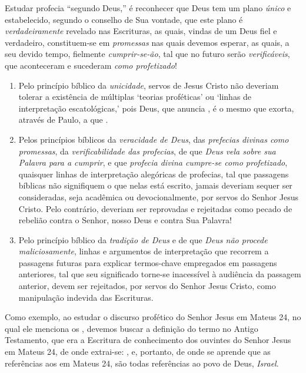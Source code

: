     Estudar profecia ``segundo Deus,'' é reconhecer que Deus tem um plano \emph{único} e estabelecido, segundo o conselho de Sua
    vontade, que este plano é \emph{verdadeiramente} revelado nas Escrituras, as quais, vindas de um  Deus  fiel  e  verdadeiro,
    constituem-se em \emph{promessas} nas quais devemos esperar, as quais, a seu devido tempo,  fielmente  \emph{cumprir-se-ão},
    tal que no futuro serão \emph{verificáveis}, que aconteceram e sucederam \emph{como profetizado}!

    \begin{enumerate}

        \item Pelo princípio bíblico da \emph{unicidade}, servos de Jesus Cristo não deveriam tolerar  a  existência
            de múltiplas `teorias proféticas' ou `linhas de interpretação escatológicas,'  pois  Deus,  que  anuncia
            , é o mesmo que  exorta,  através  de  Paulo,  a  que  .

        \item Pelos princípios bíblicos da \emph{veracidade de Deus}, das \emph{prefecias divinas  como  promessas},
            da \emph{verificabilidade das profecias}, de que \emph{Deus vela sobre sua Palavra para  a  cumprir},  e
            que \emph{profecia divina cumpre-se como profetizado}, quaisquer linhas de interpretação  alegóricas  de
            profecias, tal que passagens bíblicas não signifiquem o que nelas está escrito, jamais  deveriam  sequer
            ser consideradas, seja acadêmica ou devocionalmente, por servos do Senhor Jesus Cristo. Pelo  contrário,
            deveriam ser reprovadas e rejeitadas como pecado de rebelião contra o Senhor, nosso Deus  e  contra  Sua
            Palavra!

        \item Pelo princípio bíblico da \emph{tradição de Deus} e de que  \emph{Deus  não  procede  maliciosamente},
            linhas e argumentos de interpretação  que  recorrem  a  passagens  futuras  para  explicar  termos-chave
            empregados em passagens anteriores, tal que seu significado torne-se inacessível à audiência da passagem
            anterior, devem ser rejeitados, por servos  do  Senhor  Jesus  Cristo,  como  manipulação  indevida  das
            Escrituras.

    \end{enumerate}

    Como exemplo, ao estudar o discurso profético do Senhor Jesus em Mateus 24, no qual  ele  menciona  os  ,
    devemos buscar a definição do termo no Antigo Testamento, que era a Escritura de conhecimento dos ouvintes do  Senhor  Jesus
    em Mateus 24, de onde extrai-se: , e, portanto, de onde  se  aprende  que  as  referências  aos
     em Mateus 24, são todas referências ao povo de Deus, \emph{Israel}.

